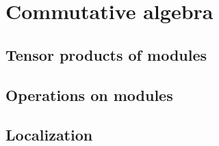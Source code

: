 \chapter{Commutative algebra}

\section{Tensor products of modules}
\label{sec:tensor-products-of-modules}

\section{Operations on modules}
\label{sec:operations-on-modules}

\section{Localization}
\label{sec:localization}